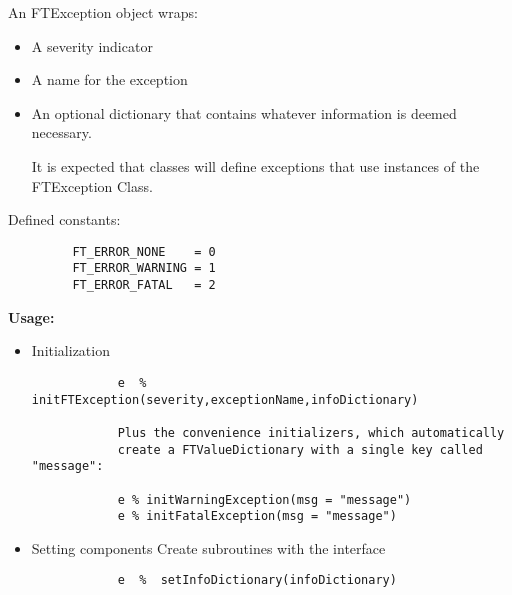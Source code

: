 \documentclass[9pt]{article}
\begin{document}
      An FTException object wraps:
      \begin{itemize}
      \item A severity indicator
      \item A name for the exception
      \item An optional dictionary that contains whatever information is deemed necessary.

      It is expected that classes will define exceptions that use instances
      of the FTException Class.
      \end{itemize}
      
      Defined constants:
{\color{blue}\begin{verbatim}
         FT_ERROR_NONE    = 0
         FT_ERROR_WARNING = 1
         FT_ERROR_FATAL   = 2
\end{verbatim}}

     {\bf Usage:}
\begin{itemize}
\item Initialization
	{\color{blue}\begin{verbatim}
            e  %  initFTException(severity,exceptionName,infoDictionary)

            Plus the convenience initializers, which automatically 
            create a FTValueDictionary with a single key called "message":

            e % initWarningException(msg = "message")
            e % initFatalException(msg = "message")
	\end{verbatim}}
	
\item Setting components
   Create subroutines with the interface
{\color{blue}\begin{verbatim}
            e  %  setInfoDictionary(infoDictionary)
\end{verbatim}}

\end{itemize}
\end{document}
